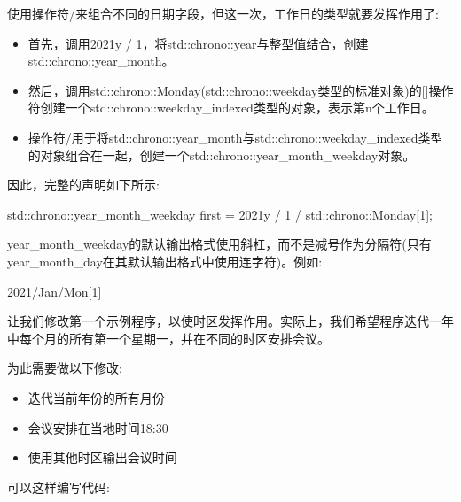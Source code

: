 使用操作符/来组合不同的日期字段，但这一次，工作日的类型就要发挥作用了:

\begin{itemize}
\item
首先，调用2021y / 1，将std::chrono::year与整型值结合，创建std::chrono::year\_month。

\item
然后，调用std::chrono::Monday(std::chrono::weekday类型的标准对象)的[]操作符创建一个std::chrono::weekday\_indexed类型的对象，表示第n个工作日。

\item
操作符/用于将std::chrono::year\_month与std::chrono::weekday\_indexed类型的对象组合在一起，创建一个std::chrono::year\_month\_weekday对象。
\end{itemize}

因此，完整的声明如下所示:

\begin{cpp}
std::chrono::year_month_weekday first = 2021y / 1 / std::chrono::Monday[1];
\end{cpp}

year\_month\_weekday的默认输出格式使用斜杠，而不是减号作为分隔符(只有year\_month\_day在其默认输出格式中使用连字符)。例如:

\begin{shell}
2021/Jan/Mon[1]
\end{shell}


让我们修改第一个示例程序，以使时区发挥作用。实际上，我们希望程序迭代一年中每个月的所有第一个星期一，并在不同的时区安排会议。

为此需要做以下修改:

\begin{itemize}
\item
迭代当前年份的所有月份

\item
会议安排在当地时间18:30

\item
使用其他时区输出会议时间
\end{itemize}

可以这样编写代码:



